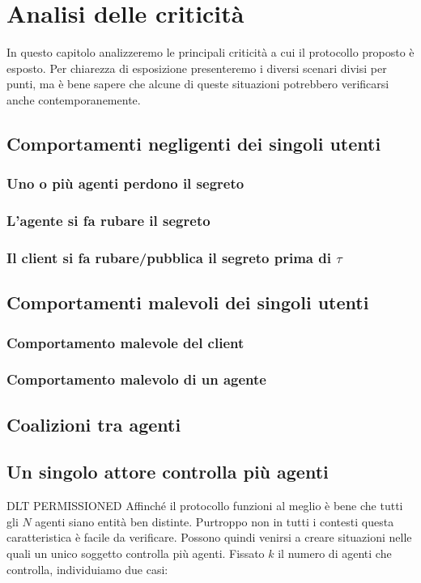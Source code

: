 \chapter{Analisi delle criticità}
\label{chap:analisi-attacchi}
In questo capitolo analizzeremo le principali criticità a cui il protocollo
proposto è esposto. Per chiarezza di esposizione presenteremo
i diversi scenari divisi per punti, ma è bene
sapere che alcune di queste situazioni potrebbero verificarsi anche contemporanemente.

\section{Comportamenti negligenti dei singoli utenti}
\subsection{Uno o più agenti perdono il segreto}


\subsection{L'agente si fa rubare il segreto}

\subsection{Il client si fa rubare/pubblica il segreto prima di $ \tau $}


\section{Comportamenti malevoli dei singoli utenti}
\subsection{Comportamento malevole del client}

\subsection{Comportamento malevolo di un agente}


\section{Coalizioni tra agenti}


\section{Un singolo attore controlla più agenti}
DLT PERMISSIONED
Affinché il protocollo funzioni al meglio
è bene che tutti gli $ N $ agenti
siano entità ben distinte. Purtroppo non in tutti i contesti
questa caratteristica è facile da verificare.
Possono quindi venirsi a creare situazioni nelle quali un unico soggetto controlla
più agenti. Fissato $ k $ il numero di agenti che controlla,
individuiamo due casi:

